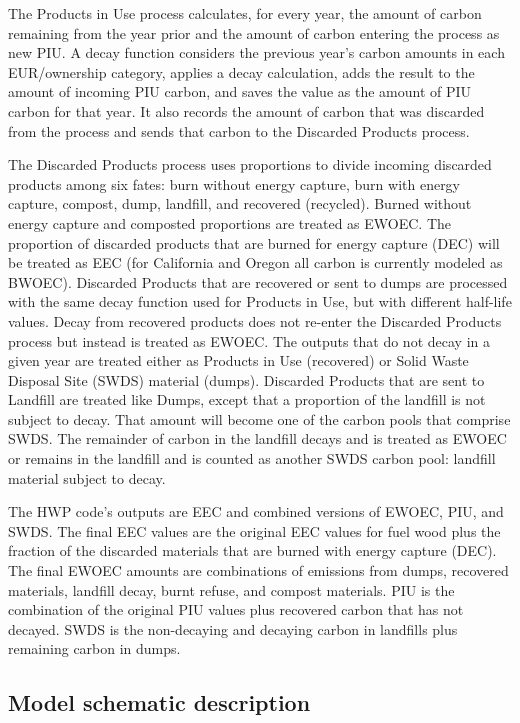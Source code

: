 \documentclass[
  openany]{book}
\begin{document}
The Products in Use process calculates, for every year, the amount of carbon remaining from the year prior and the amount of carbon entering the process as new PIU. A decay function considers the previous year's carbon amounts in each EUR/ownership category, applies a decay calculation, adds the result to the amount of incoming PIU carbon, and saves the value as the amount of PIU carbon for that year. It also records the amount of carbon that was discarded from the process and sends that carbon to the Discarded Products process.

The Discarded Products process uses proportions to divide incoming discarded products among six fates: burn without energy capture, burn with energy capture, compost, dump, landfill, and recovered (recycled). Burned without energy capture and composted proportions are treated as EWOEC. The proportion of discarded products that are burned for energy capture (DEC) will be treated as EEC (for California and Oregon all carbon is currently modeled as BWOEC). Discarded Products that are recovered or sent to dumps are processed with the same decay function used for Products in Use, but with different half-life values. Decay from recovered products does not re-enter the Discarded Products process but instead is treated as EWOEC. The outputs that do not decay in a given year are treated either as Products in Use (recovered) or Solid Waste Disposal Site (SWDS) material (dumps). Discarded Products that are sent to Landfill are treated like Dumps, except that a proportion of the landfill is not subject to decay. That amount will become one of the carbon pools that comprise SWDS. The remainder of carbon in the landfill decays and is treated as EWOEC or remains in the landfill and is counted as another SWDS carbon pool: landfill material subject to decay.

The HWP code's outputs are EEC and combined versions of EWOEC, PIU, and SWDS. The final EEC values are the original EEC values for fuel wood plus the fraction of the discarded materials that are burned with energy capture (DEC). The final EWOEC amounts are combinations of emissions from dumps, recovered materials, landfill decay, burnt refuse, and compost materials. PIU is the combination of the original PIU values plus recovered carbon that has not decayed. SWDS is the non-decaying and decaying carbon in landfills plus remaining carbon in dumps.

\hypertarget{model-func-schdesc}{%
\subsection{Model schematic description}\label{model-func-schdesc}}
\end{document}
